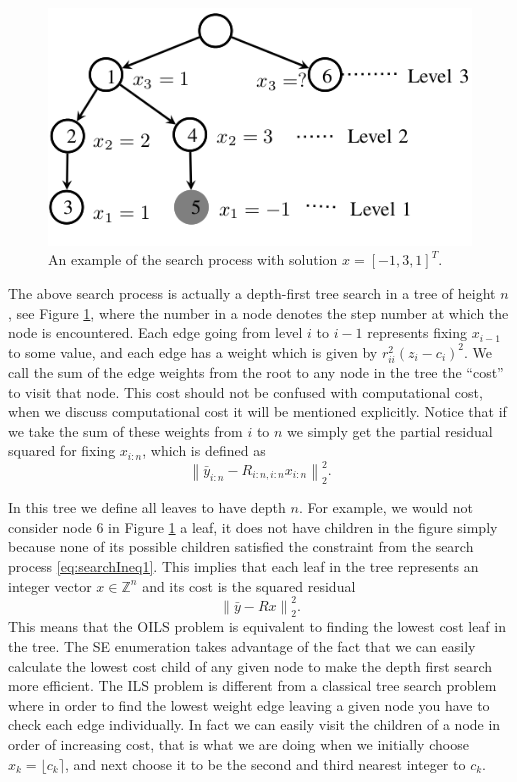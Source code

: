 \documentclass[12pt,Bold,letterpaper]{mcgilletdclass}
\begin{document}
\begin{figure}
\centering
\includegraphics[scale=0.5]{searchtree.png}
\caption{An example of the search process with solution $x = [-1,3,1]^T$.}
\label{fig:treeSearch}
\end{figure}

The above search process is actually a depth-first tree search in a tree of height $n$, see Figure \ref{fig:treeSearch},
where the number in a node  denotes the step number at which the node is encountered. Each edge going from level $i$ to $i-1$ represents fixing $x_{i-1}$ to some value, and each edge has a weight which is given by $r_{ii}^2(z_i -
c_i)^2$. We call the sum of the edge weights from the root to any node in the tree the ``cost'' to visit that node. This cost should not be confused with computational cost, when we discuss computational cost it will be mentioned explicitly. Notice that if we take the sum of these weights from $i$ to $n$ we simply get the partial
residual squared for fixing $x_{i:n}$, which is defined as $$\left \| \bar{y}_{i:n} - R_{i:n,i:n}x_{i:n} \right \|_2^2.$$ 

In this tree we define all leaves to have depth $n$. For example, we would not consider node $6$ in Figure \ref{fig:treeSearch} a leaf, it does not have children in the figure simply because none of its possible children satisfied the constraint from the search process \eqref{eq:searchIneq1}. This implies that each leaf in the tree
represents an integer vector $x \in \mathbb{Z}^n$ and its cost is the squared residual $$\left \|
 \bar{y} - Rx \right \|_2^2.$$ This means that the OILS problem is equivalent to
finding the lowest cost leaf in the tree. The SE enumeration takes advantage
of the fact that we can easily calculate the lowest cost child of any given
node to make the depth first search more efficient. The ILS problem is different from a classical tree search problem where in order to find the lowest weight edge leaving a given node you have to check each edge individually. In fact we can easily visit
the children of a node in order of increasing cost, that is what we are doing when we initially choose $x_k = \lfloor c_k \rceil$, and next choose it to be the second and third nearest integer to $c_k$.
\end{document}
